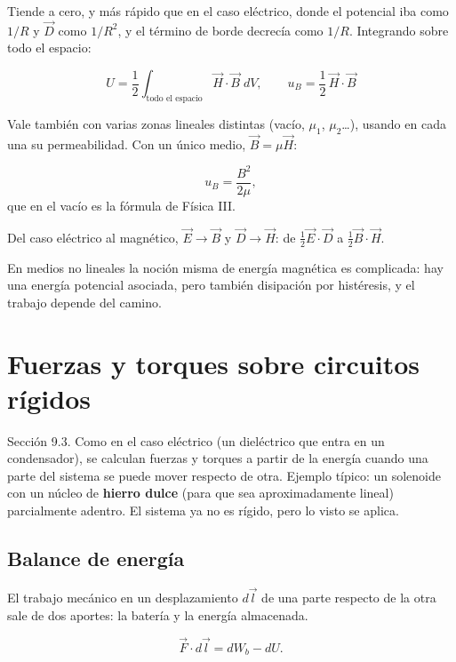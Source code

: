 \documentclass[12pt,a4paper]{article}
\begin{document}
Tiende a cero, y más rápido que en el caso eléctrico, donde el potencial iba
como $1/R$ y $\vec D$ como $1/R^2$, y el término de borde decrecía como $1/R$.
Integrando sobre todo el espacio:

\begin{keybox}
\[
\boxed{\ U = \frac12\int_{\text{todo el espacio}}\vec H\cdot\vec B\;dV,
\qquad u_B = \frac12\,\vec H\cdot\vec B\ }
\]
\end{keybox}

Vale también con varias zonas lineales distintas (vacío, $\mu_1$, $\mu_2$\dots{}),
usando en cada una su permeabilidad. Con un único medio, $\vec B = \mu\vec H$:

\[
u_B = \frac{B^2}{2\mu},
\]
que en el vacío es la fórmula de Física III.

\begin{notebox}
Del caso eléctrico al magnético, $\vec E\to\vec B$ y
$\vec D\to\vec H$: de $\tfrac12\vec E\cdot\vec D$ a $\tfrac12\vec B\cdot\vec H$.
\end{notebox}

\begin{notebox}
En medios no lineales la noción misma de energía magnética es complicada:
hay una energía potencial asociada, pero también disipación por histéresis,
y el trabajo depende del camino.
\end{notebox}

\section{Fuerzas y torques sobre circuitos rígidos}

Sección 9.3. Como en el caso eléctrico (un dieléctrico que entra en un
condensador), se calculan fuerzas y torques a partir de la energía cuando una
parte del sistema se puede mover respecto de otra. Ejemplo típico: un solenoide
con un núcleo de \textbf{hierro dulce} (para que sea aproximadamente lineal)
parcialmente adentro. El sistema ya no es rígido, pero lo visto se aplica.

\subsection{Balance de energía}

El trabajo mecánico en un desplazamiento $d\vec l$ de una parte respecto de la
otra sale de dos aportes: la batería y la energía almacenada.

\[
\vec F\cdot d\vec l = dW_b - dU .
\]
\end{document}
